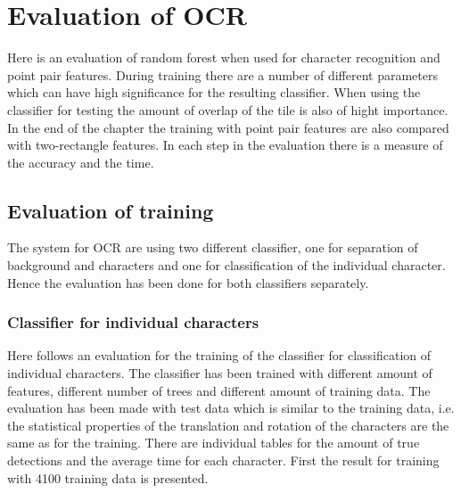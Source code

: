 \chapter{Evaluation of OCR}
\label{sec:Evaluation of OCR}
Here is an evaluation of random forest when used for character recognition and point pair features. During training there are a number of different parameters which can have high significance for the resulting classifier. When using the classifier for testing the amount of overlap of the tile is also of hight importance. In the end of the chapter the training with point pair features are also compared with two-rectangle features. In each step in the evaluation there is a measure of the accuracy and the time.

\section{Evaluation of training}
\label{sec:Evaluation of training}
The system for OCR are using two different classifier, one for separation of background and characters and one for classification of the individual character. Hence the evaluation has been done for both classifiers separately.
 
\subsection{Classifier for individual characters}
\label{sec:Classifier for individual characters}
Here follows an evaluation for the training of the classifier for classification of individual characters. The classifier has been trained with different amount of features, different number of trees and different amount of training data. The evaluation has been made with test data which is similar to the training data, i.e. the statistical properties of the translation and rotation of the characters are the same as for the training. There are individual tables for the amount of true detections and the average time for each character. First the result for training with 4100 training data is presented.
 
